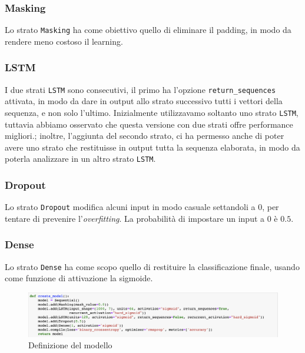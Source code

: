 \documentclass[8pt,notitlepage]{report}
\begin{document}
				\subsubsection{Masking}
					Lo strato \verb|Masking| ha come obiettivo quello di eliminare il padding, in modo da rendere meno costoso il learning.
					
				\subsubsection{LSTM}
					I due strati \verb|LSTM| sono consecutivi, il primo ha l'opzione \verb|return_sequences| attivata, in modo da dare in output allo strato successivo tutti i vettori della sequenza, e non solo l'ultimo. Inizialmente utilizzavamo soltanto uno strato \verb|LSTM|, tuttavia abbiamo osservato che questa versione con due strati offre performance migliori.; inoltre, l'aggiunta del secondo strato, ci ha permesso anche di poter avere uno strato che restituisse in output tutta la sequenza elaborata, in modo da poterla analizzare in un altro strato \verb|LSTM|.
					
				\subsubsection{Dropout}
					Lo strato \verb|Dropout| modifica alcuni input in modo casuale settandoli a $ 0 $, per tentare di prevenire l'\textit{overfitting}. La probabilità di impostare un input a $ 0 $ è $ 0.5 $.
					
				\subsubsection{Dense}
					Lo strato \verb|Dense| ha come scopo quello di restituire la classificazione finale, usando come funzione di attivazione la sigmoide. 
			
	
			\begin{figure}
				\begin{center}
					\includegraphics[scale=.45]{def_model}
					\caption{Definizione del modello}
				\end{center}
			\end{figure}					
					
\end{document}
